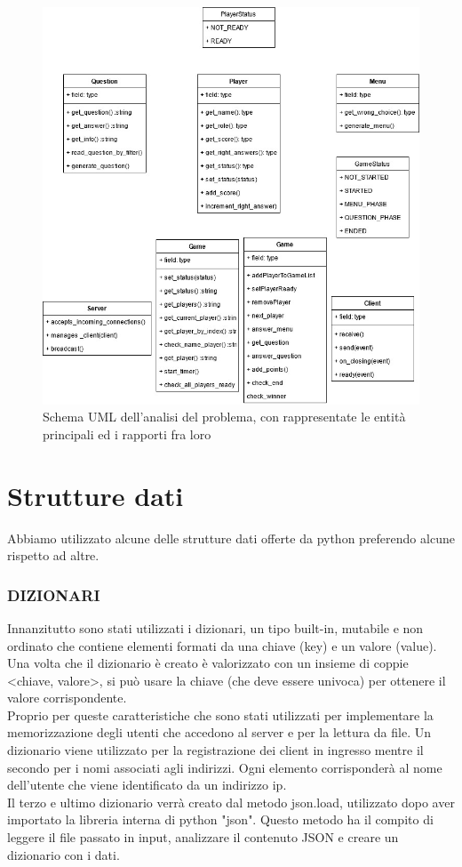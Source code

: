 \documentclass[a4paper,12pt]{report}
\begin{document}
\begin{figure}[h]
\includegraphics[width=\textwidth,height=\textheight,keepaspectratio]{img/uml.jpg}
\caption{Schema UML dell'analisi del problema, con rappresentate le entità principali ed i rapporti fra loro}
\end{figure}

\chapter{Strutture dati}
Abbiamo utilizzato alcune delle strutture dati offerte da python preferendo alcune rispetto ad altre.
\subsection{DIZIONARI}
Innanzitutto sono stati utilizzati i dizionari, un tipo built-in, mutabile e non ordinato che contiene elementi formati da una chiave (key) e un valore (value). Una volta che il dizionario è creato è valorizzato con un insieme di coppie <chiave, valore>, si può usare la chiave (che deve essere univoca) per ottenere il valore corrispondente. \\ Proprio per queste caratteristiche che sono stati utilizzati per implementare la memorizzazione degli utenti che accedono al server e per la lettura da file. Un dizionario viene utilizzato per la registrazione dei client in ingresso mentre il secondo per i nomi associati agli indirizzi. Ogni elemento corrisponderà al nome dell'utente che viene identificato da un indirizzo ip.\\
Il terzo e ultimo dizionario verrà creato dal metodo json.load, utilizzato dopo aver importato la libreria interna di python "json".
Questo metodo ha il compito di leggere il file passato in input, analizzare il contenuto JSON e creare un dizionario con i dati.
 
\end{document}
